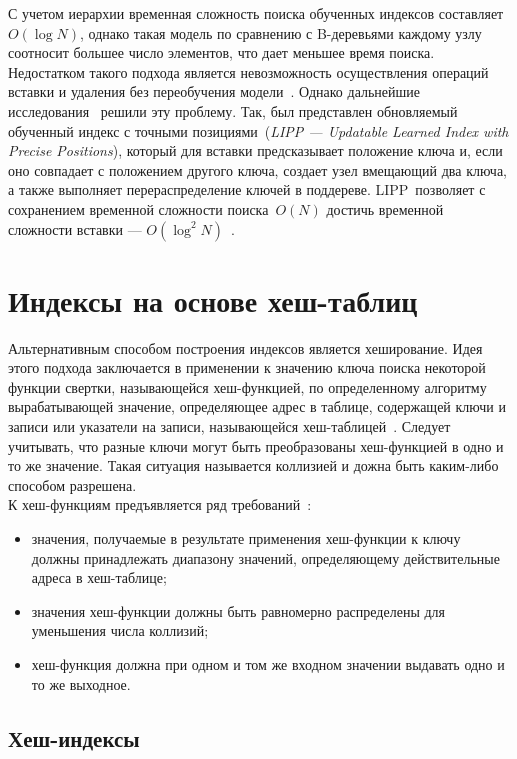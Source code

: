 С учетом иерархии временная сложность поиска обученных индексов
составляет~$O(\log N)$, однако такая модель по сравнению с B-деревьями каждому
узлу соотносит большее число элементов, что дает меньшее время поиска.
Недостатком такого подхода является невозможность осуществления операций вставки
и удаления без переобучения модели~\cite{ulipp}. Однако дальнейшие
исследования~\cite{alex, apex, ulipp, pgmi} решили эту проблему. Так, был
представлен обновляемый обученный индекс с точными позициями~(\textit{LIPP --- Updatable
Learned Index with Precise Positions}), который для вставки предсказывает
положение ключа и, если оно совпадает с положением другого ключа, создает узел
вмещающий два ключа, а также выполняет перераспределение ключей в поддереве.
LIPP~позволяет с сохранением временной сложности поиска~$O(N)$ достичь
временной сложности вставки --- $O(\log^2 N)$~\cite{ulipp}.

\section{Индексы на основе хеш-таблиц}

Альтернативным способом построения индексов является хеширование. Идея этого
подхода заключается в применении к значению ключа поиска некоторой функции
свертки, называющейся хеш-функцией, по определенному алгоритму вырабатывающей
значение, определяющее адрес в таблице, содержащей ключи и записи или указатели
на записи, называющейся хеш-таблицей~\cite{osip}. Следует учитывать,
что разные ключи могут быть преобразованы хеш-функцией в одно и то же значение.
Такая ситуация называется коллизией и дожна быть каким-либо способом
разрешена.
~\\

К хеш-функциям предъявляется ряд требований~\cite{baw, marvel}:
\begin{itemize}
    \item значения, получаемые в результате применения хеш-функции к ключу
        должны принадлежать диапазону значений, определяющему действительные
        адреса в хеш-таблице;
    \item значения хеш-функции должны быть равномерно распределены для
        уменьшения числа коллизий;
    \item хеш-функция должна при одном и том же входном значении выдавать одно
        и то же выходное.
\end{itemize}

\subsection{Хеш-индексы}

